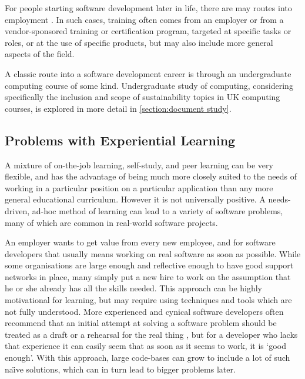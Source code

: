 For people starting software development later in life, there are may routes into employment \citep{Hyrynsalmi2024}. In such cases, training often comes from an employer or from a vendor-sponsored training or certification program, targeted at specific tasks or roles, or at the use of specific products, but may also include more general aspects of the field. 

A classic route into a software development career is through an undergraduate computing course of some kind. Undergraduate study of computing, considering specifically the inclusion and scope of sustainability topics in UK computing courses, is explored in more detail in \autoref{section:document study}.

\subsection*{Problems with Experiential Learning}

A mixture of on-the-job learning, self-study, and peer learning can be very flexible, and has the advantage of being much more closely suited to the needs of working in a particular position on a particular application than any more general educational curriculum. However it is not universally positive. A needs-driven, ad-hoc method of learning can lead to a variety of software problems, many of which are common in real-world software projects.

An employer wants to get value from every new employee, and for software developers that usually means working on real software as soon as possible. While some organisations are large enough and reflective enough to have good support networks in place, many simply put a new hire to work on the assumption that he or she already has all the skills needed. This approach can be highly motivational for learning, but may require using techniques and tools which are not fully understood. More experienced and cynical software developers often recommend that an initial attempt at solving a software problem should be treated as a draft or a rehearsal for the real thing \citep{Brooks1995}, but for a developer who lacks that experience it can easily seem that as soon as it seems to work, it is `good enough'. With this approach, large code-bases can grow to include a lot of such na{\"\i}ve solutions, which can in turn lead to bigger problems later.

